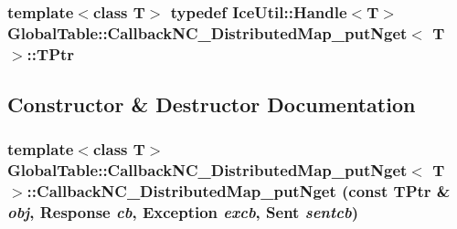 \label{class_global_table_1_1_callback_n_c___distributed_map__put_nget_ab35fdf71fb5a996677b4a7c079a00f6f}
\hypertarget{class_global_table_1_1_callback_n_c___distributed_map__put_nget_af10659383ce85f40612aa261f2b226db}{
\subsubsection[{TPtr}]{\setlength{\rightskip}{0pt plus 5cm}template$<$class T$>$ typedef IceUtil::Handle$<$T$>$ {\bf GlobalTable::CallbackNC\_\-DistributedMap\_\-putNget}$<$ T $>$::{\bf TPtr}}}
\label{class_global_table_1_1_callback_n_c___distributed_map__put_nget_af10659383ce85f40612aa261f2b226db}


\subsection{Constructor \& Destructor Documentation}
\hypertarget{class_global_table_1_1_callback_n_c___distributed_map__put_nget_a36edb31c5388530d311c78e46e60bbd3}{
\subsubsection[{CallbackNC\_\-DistributedMap\_\-putNget}]{\setlength{\rightskip}{0pt plus 5cm}template$<$class T$>$ {\bf GlobalTable::CallbackNC\_\-DistributedMap\_\-putNget}$<$ T $>$::{\bf CallbackNC\_\-DistributedMap\_\-putNget} (const {\bf TPtr} \& {\em obj}, \/  {\bf Response} {\em cb}, \/  {\bf Exception} {\em excb}, \/  {\bf Sent} {\em sentcb})}}
\label{class_global_table_1_1_callback_n_c___distributed_map__put_nget_a36edb31c5388530d311c78e46e60bbd3}


